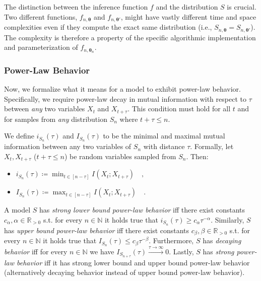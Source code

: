 \documentclass[../../main.tex]{subfiles}
\begin{document}
    \begin{remark}
        The distinction between the inference function $f$ and the distribution $S$ is crucial. Two different functions, $f_{n, \bm{\theta}}$ and $f_{n, \bm{\theta}'}$, might have vastly different time and space complexities even if they compute the exact same distribution (i.e., $S_{n, \bm{\theta}} = S_{n, \bm{\theta}'}$). The complexity is therefore a property of the specific algorithmic implementation and parameterization of $f_{n, \bm{\theta}_n}$.
    \end{remark}


\subsubsection{Power-Law Behavior}
    Now, we formalize what it means for a model to exhibit power-law behavior. Specifically, we require power-law decay in mutual information with respect to $\tau$ between \emph{any} two variables $X_t$ and $X_{t + \tau}$. This condition must hold for all $t$ and for samples from \emph{any} distribution $S_n$ where $t + \tau \leq n$.

    \begin{definition}
        We define $i_{S_n}(\tau)$ and $I_{S_n}(\tau)$ to be the minimal and maximal mutual information between any two variables of $S_n$ with distance $\tau$. Formally, let $X_t, X_{t + \tau}$ ($t + \tau \leq n$) be random variables sampled from $S_n$. Then:
        \vspace{-1em}
        \begin{itemize}
            \item $i_{S_n}(\tau) \coloneqq \min_{t \in [n - \tau]} I(X_t; X_{t + \tau}) \quad ,$
            \item $I_{S_n}(\tau) \coloneqq \max_{t \in [n - \tau]} I(X_t; X_{t + \tau}) \quad .$
        \end{itemize}
    \end{definition}

    \begin{definition}
        \label{definition:strong_model_power_law_behavior}
        A model $S$ has \emph{strong lower bound power-law behavior} iff there exist constants $c_\alpha, \alpha \in \mathbb{R}_{>0}$ s.t. for every $n \in \mathbb{N}$ it holds true that $i_{S_n}(\tau) \geq c_\alpha \tau^{-\alpha}$. Similarly, $S$ has \emph{upper bound power-law behavior} iff there exist constants $c_\beta, \beta \in \mathbb{R}_{>0}$ s.t. for every $n \in \mathbb{N}$ it holds true that $I_{S_n}(\tau) \leq c_\beta \tau^{-\beta}$. Furthermore, $S$ has \emph{decaying behavior} iff for every $n \in \mathbb{N}$ we have $I_{S_{n + \tau}}(\tau) \xrightarrow{\tau \to \infty} 0$. Lastly, $S$ has \emph{strong power-law behavior} iff it has strong lower bound and upper bound power-law behavior (alternatively decaying behavior instead of upper bound power-law behavior).
    \end{definition}
\end{document}
